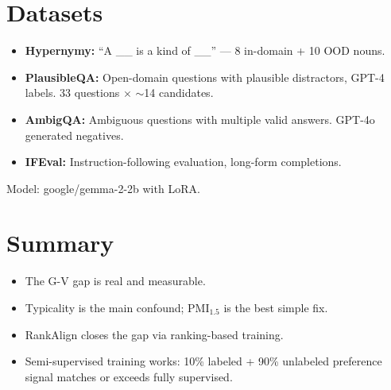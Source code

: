 \documentclass[11pt]{article}
\begin{document}
\section{Datasets}

\begin{itemize}
  \item \textbf{Hypernymy:} ``A \_\_ is a kind of \_\_'' --- 8 in-domain + 10 OOD nouns.
  \item \textbf{PlausibleQA:} Open-domain questions with plausible distractors, GPT-4 labels. 33 questions $\times$ $\sim$14 candidates.
  \item \textbf{AmbigQA:} Ambiguous questions with multiple valid answers. GPT-4o generated negatives.
  \item \textbf{IFEval:} Instruction-following evaluation, long-form completions.
\end{itemize}

Model: google/gemma-2-2b with LoRA.


\section{Summary}

\begin{itemize}
  \item The G-V gap is real and measurable.
  \item Typicality is the main confound; PMI$_{1.5}$ is the best simple fix.
  \item RankAlign closes the gap via ranking-based training.
  \item Semi-supervised training works: 10\% labeled + 90\% unlabeled preference signal matches or exceeds fully supervised.
\end{itemize}
\end{document}
